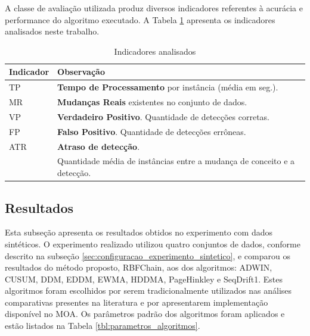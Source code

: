 \documentclass[msc, classic, a4paper]{ufbathesis}
\begin{document}
A classe de avaliação utilizada produz diversos indicadores referentes à acurácia e performance do algoritmo executado.
A Tabela \ref{tbl:indicadores_analisado} apresenta os indicadores analisados neste trabalho.


\begin{table}[h]
\centering
\caption{Indicadores analisados}
\label{tbl:indicadores_analisado}
\begin{tabularx}{\textwidth}{ll}
\toprule
Indicador & Observação \\
\midrule
TP       &  \textbf{Tempo de Processamento} por instância (média em seg.). \\
MR       &  \textbf{Mudanças Reais} existentes no conjunto de dados. \\
VP       &  \textbf{Verdadeiro Positivo}. Quantidade de detecções corretas. \\
FP       &  \textbf{Falso Positivo}. Quantidade de detecções errôneas. \\
ATR      &  \textbf{Atraso de detecção}. \\ 
         &  Quantidade média de instâncias entre a mudança de conceito e a detecção. \\
\bottomrule
\end{tabularx}
\end{table}

\subsection{Resultados}

Esta subseção apresenta os resultados obtidos no experimento com dados sintéticos. O experimento realizado utilizou quatro conjuntos de dados, conforme descrito na subseção \ref{sec:configuracao_experimento_sintetico}, e comparou os resultados do método proposto, RBFChain, aos dos algoritmos: ADWIN, CUSUM, DDM, EDDM, EWMA, HDDMA, PageHinkley e SeqDrift1.
Estes algoritmos foram escolhidos por serem tradicionalmente utilizados nas análises comparativas presentes na literatura \cite{Gama:2014:SCD:2597757.2523813, Ross:2012:EWM:2076039.2076307, Barros:RDDM:2017, BlancoCRBDM15:HDDMA:HDDMW:2015} e por apresentarem implementação disponível no MOA.
Os parâmetros padrão dos algoritmos foram aplicados e estão listados na Tabela \ref{tbl:parametros_algoritmos}.
\end{document}
